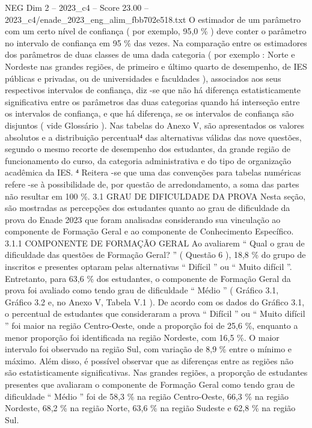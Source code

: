 \begin{textsample}{NEG Dim 2 – 2023\_c4 – Score 23.00 – 2023\_c4/enade\_2023\_eng\_alim\_fbb702e518.txt}
O estimador de um parâmetro com um certo nível de confiança ( por exemplo, 95,0 \% ) deve conter o parâmetro no intervalo de confiança em 95 \% das vezes.
Na comparação entre os estimadores dos parâmetros de duas classes de uma dada categoria ( por exemplo : Norte e Nordeste nas grandes regiões, de primeiro e último quarto de desempenho, de IES públicas e privadas, ou de universidades e faculdades ), associados aos seus respectivos intervalos de confiança, diz -se que não há diferença estatisticamente significativa entre os parâmetros das duas categorias quando há interseção entre os intervalos de confiança, e que há diferença, se os intervalos de confiança são disjuntos ( vide Glossário ).
Nas tabelas do Anexo V, são apresentados os valores absolutos e a distribuição percentual⁴ das alternativas válidas das nove questões, segundo o mesmo recorte de desempenho dos estudantes, da grande região de funcionamento do curso, da categoria administrativa e do tipo de organização acadêmica da IES. ⁴ Reitera -se que uma das convenções para tabelas numéricas refere -se à possibilidade de, por questão de arredondamento, a soma das partes não resultar em 100 \%. 3.1 GRAU DE DIFICULDADE DA PROVA Nesta seção, são mostradas as percepções dos estudantes quanto ao grau de dificuldade da prova do Enade 2023 que foram analisadas considerando sua vinculação ao componente de Formação Geral e ao componente de Conhecimento Específico. 3.1.1 COMPONENTE DE FORMAÇÃO GERAL Ao avaliarem “ Qual o grau de dificuldade das questões de Formação Geral? ” ( Questão 6 ), 18,8 \% do grupo de inscritos e presentes optaram pelas alternativas “ Difícil ” ou “ Muito difícil ”.
Entretanto, para 63,6 \% dos estudantes, o componente de Formação Geral da prova foi avaliado como tendo grau de dificuldade “ Médio ” ( Gráfico 3.1, Gráfico 3.2 e, no Anexo V, Tabela V.1 ).
De acordo com os dados do Gráfico 3.1, o percentual de estudantes que consideraram a prova “ Difícil ” ou “ Muito difícil ” foi maior na região Centro-Oeste, onde a proporção foi de 25,6 \%, enquanto a menor proporção foi identificada na região Nordeste, com 16,5 \%.
O maior intervalo foi observado na região Sul, com variação de 8,9 \% entre o mínimo e máximo.
Além disso, é possível observar que as diferenças entre as regiões não são estatisticamente significativas.
Nas grandes regiões, a proporção de estudantes presentes que avaliaram o componente de Formação Geral como tendo grau de dificuldade “ Médio ” foi de 58,3 \% na região Centro-Oeste, 66,3 \% na região Nordeste, 68,2 \% na região Norte, 63,6 \% na região Sudeste e 62,8 \% na região Sul.

\end{textsample}
